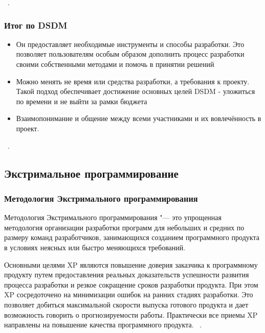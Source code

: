 \documentclass{../industrial-development}
\begin{document}
~\cite{Fowler}.


\begin{frame} \frametitle{Итог по DSDM}
	\begin{itemize}
	\item Он предоставляет необходимые инструменты и способы разработки. Это позволяет пользователям особым образом дополнить процесс разработки своими собственными методами и помочь в принятии решений 
	\item Можно менять не время или средства разработки, а требования к проекту. Такой подход обеспечивает достижение основных целей DSDM - уложиться по времени и не выйти за рамки бюджета 
	\item Взаимопонимание и общение между всеми участниками и их вовлечённость в проект. 
	\end{itemize}	
\end{frame}

\lecturenotes

~\cite{Fowler}.



\subsection{Экстримальное программирование}
\begin{frame} \frametitle{Методология Экстримального программирования}
  \begin{block}{}
   \alert{Методология Экстримального программирования} "--- это упрощенная методология организации разработки программ для небольших и средних по размеру команд разработчиков, занимающихся созданием программного продукта в условиях неясных или быстро меняющихся требований. 
  \end{block}
\end{frame}

\lecturenotes
Основными целями XP являются повышение доверия заказчика к программному продукту путем предоставления реальных доказательств успешности развития процесса разработки и резкое сокращение сроков разработки продукта. При этом XP сосредоточено на минимизации ошибок на ранних стадиях разработки. Это позволяет добиться максимальной скорости выпуска готового продукта и дает возможность говорить о прогнозируемости работы. Практически все приемы XP направлены на повышение качества программного продукта. 
~\cite{Fowler}.
\end{document}
